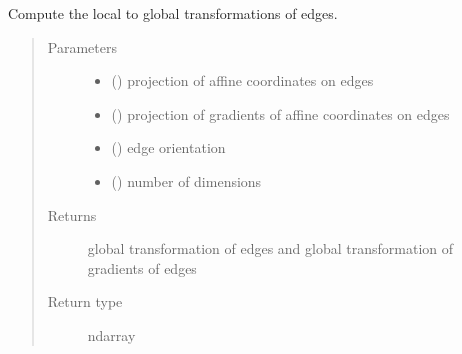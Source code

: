 \documentclass[letterpaper,10pt,english]{sphinxmanual}
\begin{document}
\begin{fulllineitems}
\label{\detokenize{petgem/hvfem:petgem.hvfem.OrientE}}
Compute the local to global transformations of edges.
\begin{quote}\begin{description}
\item[{Parameters}] \leavevmode\begin{itemize}
\item {} 
 () \textendash{} projection of affine coordinates on edges

\item {} 
 () \textendash{} projection of gradients of affine coordinates on edges

\item {} 
 () \textendash{} edge orientation

\item {} 
 () \textendash{} number of dimensions

\end{itemize}

\item[{Returns}] \leavevmode
global transformation of edges and global transformation of gradients of edges

\item[{Return type}] \leavevmode
ndarray

\end{description}\end{quote}

\end{fulllineitems}

\end{document}
